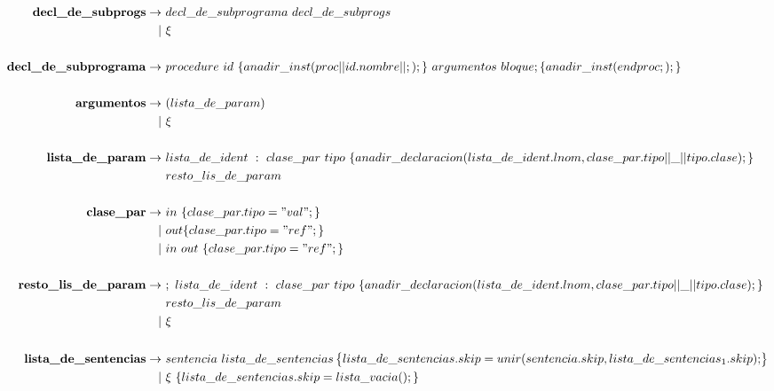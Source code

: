 \documentclass[12pt,a4paper, landscape]{article}
\theoremstyle{mytheor}
\begin{document}
\begin{center}
  \begin{alignat*}{2}
     \text{\textbf{decl\_de\_subprogs}} \to\ &decl\_de\_subprograma\ decl\_de\_subprogs\\
    |\ &\xi\\\\
     \text{\textbf{decl\_de\_subprograma}} \to\ &procedure\ id\ \{anadir\_inst( proc|| id.nombre || ;); \}\ argumentos\ bloque ; \{anadir\_inst(endproc;); \}\\\\
     \text{\textbf{argumentos}} \to\ & ( lista\_de\_param )\\
    |\ &\xi\\\\
     \text{\textbf{lista\_de\_param}} \to\ & lista\_de\_ident\ :\ clase\_par\ tipo\ \{ anadir\_declaracion(lista\_de\_ident.lnom, clase\_par.tipo||\_||tipo.clase);\}\\
    &resto\_lis\_de\_param\\\\
    \text{\textbf{clase\_par}} \to\ &in\ \{ clase\_par.tipo = "val";\}\\ 
    |\ &out  \{ clase\_par.tipo = "ref";\}\\
    |\ &in\ out\ \{ clase\_par.tipo = "ref";\}\\\\
     \text{\textbf{resto\_lis\_de\_param}} \to\ &;\ lista\_de\_ident\ :\ clase\_par\ tipo\ \{ anadir\_declaracion(lista\_de\_ident.lnom, clase\_par.tipo||\_||tipo.clase);\}\\
    &resto\_lis\_de\_param\\
    |\ &\xi\\\\
     \text{\textbf{lista\_de\_sentencias}} \to\ & sentencia\ lista\_de\_sentencias \begin{Bmatrix} lista\_de\_sentencias.skip=unir(sentencia.skip, lista\_de\_sentencias_1.skip); \end{Bmatrix} \\
    |\ &\xi\ \{lista\_de\_sentencias.skip=lista\_vacia();\}\\ 
  \end{alignat*}
\end{center}
\end{document}
